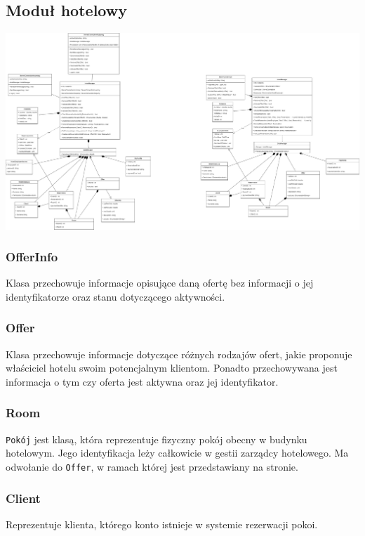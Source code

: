 \documentclass{article}
\begin{document}
\subsection{Moduł hotelowy}
\begin{center}
    \includegraphics[scale=0.36]{checkpoint1/IO Klasy-Hotel_Module.png}
\end{center}

\subsubsection{OfferInfo}
Klasa przechowuje informacje opisujące daną ofertę bez informacji o jej identyfikatorze oraz stanu dotyczącego aktywności.

\subsubsection{Offer}
Klasa przechowuje informacje dotyczące różnych rodzajów ofert, jakie proponuje właściciel hotelu swoim potencjalnym klientom. Ponadto przechowywana jest informacja o tym czy oferta jest aktywna oraz jej identyfikator.

\subsubsection{Room}
\texttt{Pokój} jest klasą, która reprezentuje fizyczny pokój obecny w budynku hotelowym. Jego identyfikacja leży całkowicie w gestii zarządcy hotelowego. Ma odwołanie do \texttt{Offer}, w ramach której jest przedsta\-wiany na stronie.

\subsubsection{Client}
Reprezentuje klienta, którego konto istnieje w systemie rezerwacji pokoi.
\end{document}
